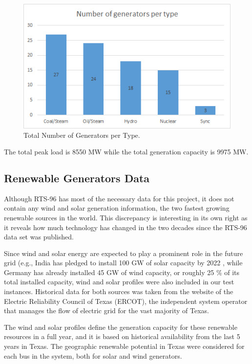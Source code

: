\documentclass[12pt,LUDisStyle,twosided]{book}
\begin{document}
\begin{figure}[H] 
  \includegraphics[width=\textwidth,height=\textheight,keepaspectratio]{numberGeneratorsPerType.png}
  \caption{Total Number of Generators per Type.}
  \label{fig:generatorDistribution}
\end{figure}

The total peak load is 8550 MW while the total generation capacity is 9975 MW. 

\subsection{Renewable Generators Data}

Although RTS-96 has most of the necessary data for this project, it does not contain any wind and solar generation information, the two fastest growing renewable sources in the world. This discrepancy is interesting in its own right as it reveals how much technology has changed in the two decades since the RTS-96 data set was published.

Since wind and solar energy are expected to play a prominent role in the future grid (e.g., India has pledged to install 100 GW of solar capacity by 2022 \cite{mitindia}, while Germany has already installed 45 GW of wind capacity, or roughly 25 \% of its total installed capacity\cite{fraunpower}, wind and solar profiles were also included in our test instances. Historical data for both sources was taken from the website of the Electric Reliability Council of Texas (ERCOT), the independent system operator that manages the flow of electric grid for the vast majority of Texas.  

The wind and solar profiles define the generation capacity for these renewable resources in a full year, and it is based on historical availability from the last 5 years in Texas. The geographic renewable potential in Texas were considered for each bus in the system, both for solar and wind generators.
\end{document}
